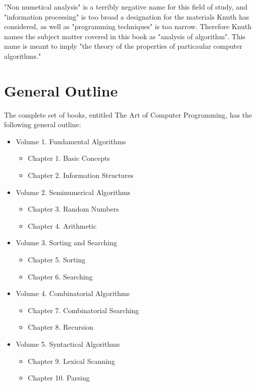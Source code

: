 \documentclass{article}
\begin{document}
"Non numetical analysis" is a terribly negative name for this field of study, and "information processing" is too broad a designation for the materials Knuth has considered, as well as "programming techniques" is too narrow. Therefore Knuth names the subject matter covered in this book as "analysis of algorithm".  This name is meant to imply "the theory of the properties of particaular computer algorithms."
\newpage

\section{General Outline}
The complete set of books, entitled The Art of Computer Programming, has the following general outline:
\begin{itemize}
    \item[] Volume 1. Fundamental Algorithms 
        \begin{itemize}
            \item[] Chapter 1. Basic Concepts
            \item[] Chapter 2. Information Structures
        \end{itemize}
    \item[] Volume 2. Seminumerical Algorithms 
        \begin{itemize}
            \item[] Chapter 3. Random Numbers
            \item[] Chapter 4. Arithmetic
        \end{itemize}    
    \item[] Volume 3. Sorting and Searching
        \begin{itemize}
            \item[] Chapter 5. Sorting
            \item[] Chapter 6. Searching
        \end{itemize}    
    \item[] Volume 4. Combinatorial Algorithms 
        \begin{itemize}
            \item[] Chapter 7. Combinatorial Searching
            \item[] Chapter 8. Recursion
        \end{itemize}
    \item[] Volume 5. Syntactical Algorithms
        \begin{itemize}
            \item[] Chapter 9. Lexical Scanning
            \item[] Chapter 10. Parsing
        \end{itemize}
\end{itemize}
\end{document}
